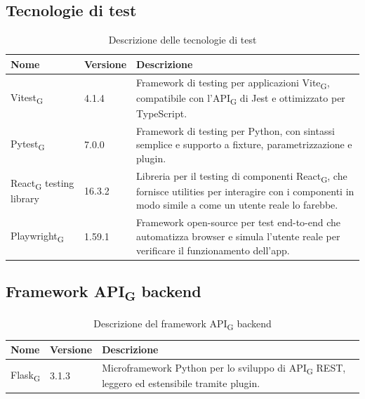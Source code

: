 \documentclass[11pt,a4paper]{article}
\newcommand{\gls}[1]{#1\textsubscript{G}}
\begin{document}
\subsection{Tecnologie di test}
\begin{table}[H]
    \centering
    \begin{tabular}{|p{}|p{}|p{}|}
        \hline
        \textbf{Nome} & \textbf{Versione} & \textbf{Descrizione} \\
        \hline
        \gls{Vitest} & 4.1.4 & Framework di testing per applicazioni \gls{Vite}, compatibile con l'\gls{API} di Jest e ottimizzato per TypeScript. \\
        \hline
        \gls{Pytest} & 7.0.0 & Framework di testing per Python, con sintassi semplice e supporto a fixture, parametrizzazione e plugin. \\
        \hline
        \gls{React} testing library & 16.3.2 & Libreria per il testing di componenti \gls{React}, che fornisce utilities per interagire con i componenti in modo simile a come un utente reale lo farebbe. \\
        \hline
        \gls{Playwright} & 1.59.1 & Framework open-source per test end-to-end che automatizza browser e simula l’utente reale per verificare il funzionamento dell’app. \\
        \hline
    \end{tabular}
    \caption{Descrizione delle tecnologie di test}
    \label{tab:tecnologie_test}
\end{table}

\subsection{Framework \gls{API} backend}
\begin{table}[H]
    \centering
    \begin{tabular}{|p{}|p{}|p{}|}
        \hline
        \textbf{Nome} & \textbf{Versione} & \textbf{Descrizione} \\
        \hline
        \gls{Flask} & 3.1.3 & Microframework Python per lo sviluppo di \gls{API} REST, leggero ed estensibile tramite plugin. \\
        \hline
    \end{tabular}
    \caption{Descrizione del framework \gls{API} backend}
    \label{tab:api_backend}
\end{table}
\end{document}

